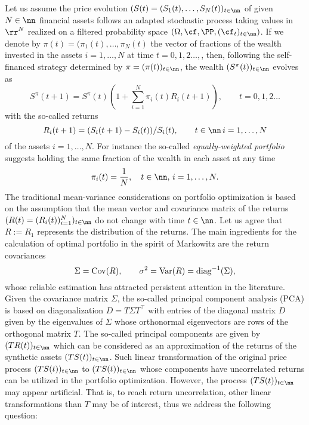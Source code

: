 Let us assume the price evolution $(S(t)=(S_1(t), \dots, S_{N}(t))_{t \in \nn}$ of 
 given  $N \in \nn$ financial assets 
 follows an adapted stochastic process taking values in $\rr^{N}$
 realized on a filtered probability space $(\Omega, \cf, \PP, (\cf_{t})_{t \in \nn})$.
If we denote by $\pi(t)=(\pi_1(t), \dots, \pi_N(t)$
the vector of fractions of the wealth invested in the assets $i=1, \dots, N$ at time $t=0, 1,2\dots,$, 
then, following  the self-financed strategy 
determined by  $\pi=(\pi(t))_{t \in \nn}$,  the wealth $(S^{\pi}(t))_{t \in \nn}$ evolves as
\begin{equation*}
S^{\pi}(t+1)=S^{\pi}(t)(1+ \sum_{i=1}^N\pi_i(t) R_i(t+1)), \qquad t=0,1,2 \dots
\end{equation*}
with the so-called returns 
\begin{equation*}
  R_i(t+1)=(S_i(t+1)-S_i(t))/S_i(t), \qquad t\in \nn \, i=1, \dots, N
\end{equation*}
of the assets $i=1, \dots, N$. For instance the so-called {\it equally-weighted portfolio}
suggests holding the same fraction of the wealth in each asset at any time 
\begin{equation*}
  \pi_i(t)=\frac{1}{N}, \quad t \in \nn, \, i=1, \dots, N.
\end{equation*}
The traditional mean-variance considerations on portfolio optimization is based on the 
assumption that the mean vector and covariance matrix of the returns
  $(R(t)=(R_i(t))_{i=1}^N )_{t \in \nn}$ do not change with time $t \in \nn$. Let us agree that $R:=R_1$ represents the distribution of the returns.
The main ingredients for the calculation of optimal portfolio in the spirit of 
Markowitz are the return covariances
\begin{equation}\label{eqn:sigma}
\Sigma={\rm Cov}(R), \qquad \sigma^2={\rm Var}(R)={\rm diag}^{-1}(\Sigma), 
\end{equation}
whose reliable estimation has attracted persistent attention in the literature.
Given the covariance matrix $\Sigma$, the so-called principal component analysis (PCA) 
is based on  diagonalization   $D=T \Sigma T^\top$ with  entries of the diagonal matrix $D$ given by the eigenvalues of  $\Sigma$
whose orthonormal eigenvectors are rows of the  orthogonal matrix $T$. The so-called
principal components are given by  $(T R(t))_{t \in \nn}$ which can be considered as 
an approximation of the returns of the  synthetic assets $(TS(t))_{t \in \nn}$. Such linear transformation of the original price process $(T S(t))_{t \in \nn}$ to  $(TS(t))_{t \in \nn}$  whose components  have  uncorrelated returns can be  utilized  in the  portfolio optimization. However, the process $(TS(t))_{t \in \nn}$ may appear artificial. That is, to reach return uncorrelation, other  linear  transformations than  $T$  may be of interest, thus  we address the following question:
